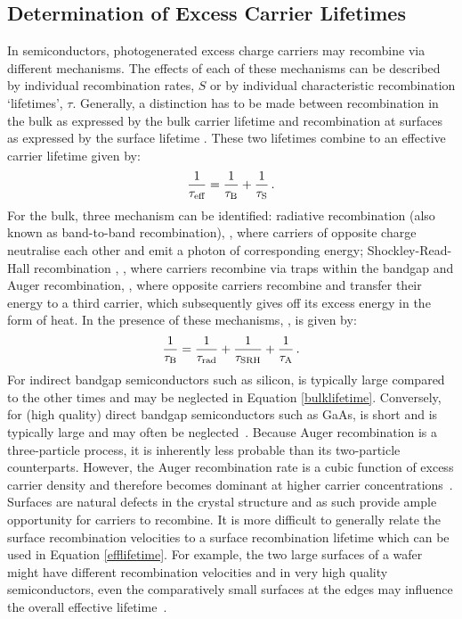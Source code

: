 \subsection{Determination of Excess Carrier Lifetimes}
In semiconductors, photogenerated excess charge carriers may recombine via different mechanisms. The effects of each of these mechanisms can be described by individual recombination rates, $S$ or by individual characteristic recombination `lifetimes', $\tau$. Generally, a distinction has to be made between recombination in the bulk as expressed by the bulk carrier lifetime \tbulk{} and recombination at surfaces as expressed by the surface lifetime \tsurf{}. These two lifetimes combine to an effective carrier lifetime \teff{} given by:
\begin{equation}
\label{efflifetime}
	\frac{1}{\tau_{\text{eff}}} = \frac{1}{\tau_{\text{B}}} + \frac{1}{\tau_{\text{S}}} \, .
\end{equation}
For the bulk, three mechanism can be identified: radiative recombination (also known as band-to-band recombination), \trad{}, where carriers of opposite charge neutralise each other and emit a photon of corresponding energy; Shockley-Read-Hall recombination , \tsrh{}, where carriers recombine via traps within the bandgap and Auger recombination, \taug{}, where opposite carriers recombine and transfer their energy to a third carrier, which subsequently gives off its excess energy in the form of heat. In the presence of these mechanisms, \tbulk{}, is given by:
\begin{equation}
\label{bulklifetime}
	\frac{1}{\tau_{\text{B}}} = \frac{1}{\tau_{\text{rad}}} + \frac{1}{\tau_{\text{SRH}}} + \frac{1}{\tau_{\text{A}}} \, .
\end{equation}
For indirect bandgap semiconductors such as silicon, \trad{} is typically large compared to the other times and may be neglected in Equation \eqref{bulklifetime}. Conversely, for (high quality) direct bandgap semiconductors such as GaAs, \trad{} is short and \tsrh{} is typically large and may often be neglected~\cite{gaaslifetime}. Because Auger recombination is a three-particle process, it is inherently less probable than its two-particle counterparts. However, the Auger recombination rate is a cubic function of excess carrier density and therefore becomes dominant at higher carrier concentrations~\cite{auger}. Surfaces are natural defects in the crystal structure and as such provide ample opportunity for carriers to recombine. It is more difficult to generally relate the surface recombination velocities \ssurf{} to a surface recombination lifetime which can be used in Equation \eqref{efflifetime}. For example, the two large surfaces of a wafer might have different recombination velocities and in very high quality semiconductors, even the comparatively small surfaces at the edges may influence the overall effective lifetime~\cite{edgerecom}.\\
